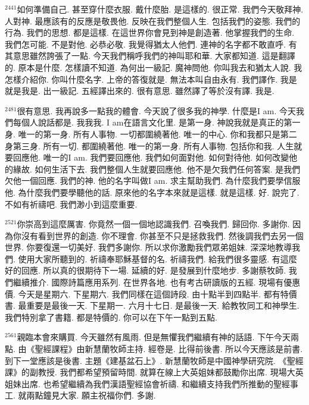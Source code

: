 \documentclass{book}
\begin{document}
$^{2441}$如何準備自己.
甚至穿什麼衣服.
戴什麼胎.
是這樣的.
很正常.
我們今天敬拜神.
人對神.
最應該有的反應是敬畏他.
反映在我們整個人生.
包括我們的姿態.
我們的行為.
我們的思想.
都是這樣.
在這世界你會見到神是創造著.
他掌握我們的生命.
我們怎可能.
不是對他.
必恭必敬.
我覺得猶太人他們.
連神的名字都不敢直呼.
有其意思雖然誇張了一點.
今天我們稱呼我們的神叫耶和華.
大家都知道.
這是翻譯的.
原本是什麼.
怎樣讀不知道.
為何出一級記.
魔神問他.
你叫我去和猶太人說.
我怎樣介紹你.
你叫什麼名字.
上帝的答復就是.
無法本叫自由永有.
我們譯作.
我是就是我是.
出一級記.
五經譯出來的.
很有意思.
雖然譯了等於沒有譯.
我是.

$^{2481}$很有意思.
我再說多一點我的體會.
今天說了很多我的神學.
什麼是I am.
今天我們每個人說話都是.
我我我.
I am在語言文化里.
是第一身.
神說我就是真正的第一身.
唯一的第一身.
所有人事物.
一切都圍繞著他.
唯一的中心.
你和我都只是第二身第三身.
所有一切.
都圍繞著他.
唯一的第一身.
所有人事物.
包括你和我.
人生就要回應他.
唯一的I am.
我們要回應他.
我們如何面對他.
如何對待他.
如何改變他的緣故.
如何生活下去.
我們整個人生就要回應他.
他不是欠我們任何答案.
是我們欠他一個回應.
我們的神.
他的名字叫做I am.
求主幫助我們.
為什麼我們要學信服他.
為什麼我們要學聽他的話.
原來他的名字本來就是這樣.
就是這樣.
好.
說完了.
不如有祈禱吧.
我們渺小到這麼重要.

$^{2521}$你崇高到這麼厲害.
你竟然一個一個地認識我們.
召喚我們.
歸回你.
多謝你.
因為你沒有看到世界的創造.
你不理會.
你甚至不只是拯救我們.
然後調我們去另一個世界.
你要復還一切美好.
我們多謝你.
所以求你激勵我們眾弟姐妹.
深深地教導我們.
使用大家所聽到的.
祈禱奉耶穌基督的名.
祈禱我們.
給我們很多靈感.
有這麼好的回應.
所以真的很期待下一場.
延續的好.
是發展到什麼地步.
多謝蔡牧師.
我們繼續推介.
國際詩篇應用系列.
在世界各地.
也有考古研讀版的五經.
現場有優惠價.
今天是星期六.
下星期六.
我們同樣在這個詩段.
由十點半到四點半.
都有特價書.
最重要是最後一天.
下星期一.
六月十七日.
是最後一天.
給教牧同工和神學生.
我們特別拿了書籍.
都是特價的.
你可以在下午一點到五點.

$^{2561}$親臨本會來購買.
今天雖然有風雨.
但是無懼我們繼續有神的話語.
下午今天兩點.
由《聖經課程》由新慧蘭牧師主持.
經卷是.
比得前後書.
所以今天應該是前書.
到下一堂應該是後書.
主題《建基盆石上》.
新慧蘭牧師是中國神學研究院.
《聖經課》的副教授.
我們都希望預留時間.
就算在線上大英姐妹都鼓勵你出席.
現場大英姐妹出席.
也希望繼續為我們漢語聖經協會祈禱.
和繼續支持我們所推動的聖經事工.
就兩點鐘見大家.
願主祝福你們.
多謝.
\newpage
\end{document}
